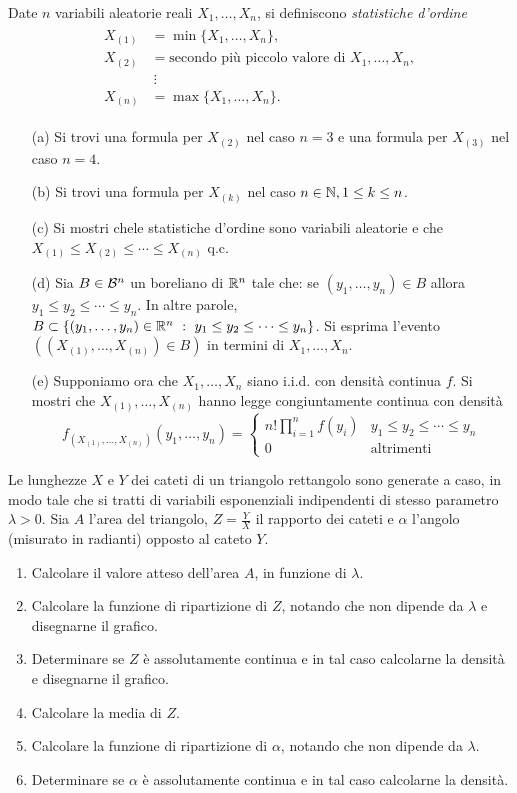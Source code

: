 \Esercizio{$^\ast$} %
Date $n$ variabili aleatorie reali $X_1,\dots,X_n$, si definiscono \emph{statistiche d'ordine}
\begin{gather*}
\begin{aligned}
X_{(1)}&=\min\{X_1,\dots,X_n  \}, \\
X_{(2)}&=\text{secondo più piccolo valore di }X_1,\dots,X_n, \\
&\ \vdots \\
X_{(n)}&=\max\{X_1,\dots,X_n  \}.
\end{aligned}
\end{gather*}
\begin{enumerate}
\item [(a)] Si trovi una formula per $X_{(2)}$ nel caso $n=3$ e una formula per $X_{(3)}$ nel caso $n=4$.
\item [(b)] Si trovi una formula per $X_{(k)}$ nel caso $n\in\mathbb{N},1\leq k\leq n$.
\item [(c)] Si mostri chele statistiche d'ordine sono variabili aleatorie e che $X_{(1)}\leq X_{(2)}\leq \cdots \leq X_{(n)}$ q.c.
\item [(d)] Sia $B\in\mathcal{B}^n$ un boreliano di $\mathbb{R}^n$ tale che: se $(y_1,\dots,y_n)\in B$ allora $y_1\leq y_2\leq \cdots\leq y_n$. In altre parole, $B\subset\{(y_1,\dots,y_n)\in\mathbb{R}^n\ :\ y_1\leq y_2\leq \cdots\leq y_n  \}$. Si esprima l'evento $((X_{(1)},\dots,X_{(n)})\in B)$ in termini di $X_1,\dots,X_n$.
\item [(e)] Supponiamo ora che $X_1,\dots,X_n$ siano i.i.d. con densità continua $f$. Si mostri che $X_{(1)},\dots,X_{(n)}$ hanno legge congiuntamente continua con densità
\[
f_{(X_{(1)},\dots,X_{(n)})}(y_1,\dots,y_n)=\begin{cases}n!\displaystyle\prod_{i=1}^n f(y_i) &y_1\leq y_2\leq \cdots\leq y_n \\ 0&\text{altrimenti}   \end{cases}
\]
\end{enumerate}

\Esercizio{}
Le lunghezze $X$ e $Y$ dei cateti di un triangolo rettangolo sono generate a caso, in modo tale che si tratti di variabili esponenziali indipendenti di stesso parametro $\lambda>0$. Sia $A$ l'area del triangolo, $Z=\frac{Y}{X}$ il rapporto dei cateti e $\alpha$ l'angolo (misurato in radianti) opposto al cateto $Y$.
\begin{enumerate}
\item Calcolare il valore atteso dell'area $A$, in funzione di $\lambda$.
\item Calcolare la funzione di ripartizione di $Z$, notando che non dipende da $\lambda$ e disegnarne il grafico.
\item Determinare se $Z$ è assolutamente continua e in tal caso calcolarne la densità e disegnarne il grafico.
\item Calcolare la media di $Z$.
\item Calcolare la funzione di ripartizione di $\alpha$, notando che non dipende da $\lambda$.
\item Determinare se $\alpha$ è assolutamente continua e in tal caso calcolarne la densità.
\end{enumerate}

